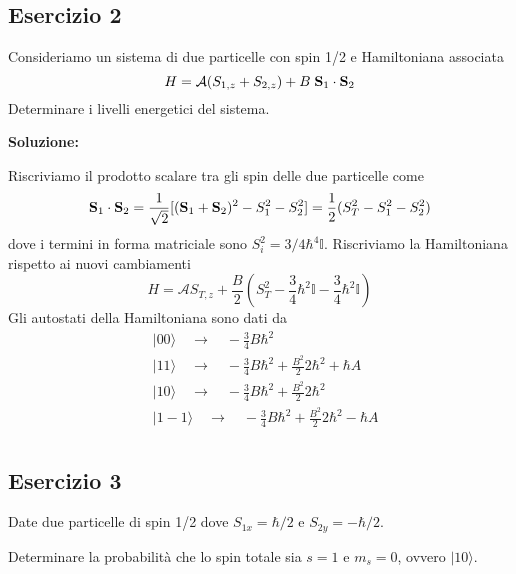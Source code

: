 \subsection{Esercizio 2}

Consideriamo un sistema di due particelle con spin 1/2 e Hamiltoniana associata
\begin{equation*}
	H = \mathcal{A}(S_{1,z}+S_{2,z}) + B \;\bold{S}_1 \cdot \bold{S}_2
\end{equation*}
Determinare i livelli energetici del sistema.
\newline

\noindent\textbf{Soluzione:}
\newline

	Riscriviamo il prodotto scalare tra gli spin delle due particelle come
\begin{equation*}
	\bold{S}_1 \cdot \bold{S}_2 = \frac{1}{\sqrt{2}}[(\bold{S}_1 + \bold{S}_2)^2 - S_1^2 -S_2^2] = \frac{1}{2}(S_T^2 - S_1^2-S_2^2)
\end{equation*}
dove i termini in forma matriciale sono $S_i^2 = 3/4 \hbar ^4  \mathbb{I}$. Riscriviamo la Hamiltoniana rispetto ai nuovi cambiamenti
\begin{equation*}
	H = \mathcal{A}S_{T,z} + \frac{B}{2}\left(S^2_T - \frac{3}{4}\hbar^2 \mathbb{I} - \frac{3}{4}\hbar^2 \mathbb{I}\right)
\end{equation*}
\newpage
Gli autostati della Hamiltoniana sono dati da 
\begin{align*}
	&|00 \rangle \quad \to \quad - \frac{3}{4}B\hbar^2 \\[0.4cm]
	&|11 \rangle \quad \to \quad - \frac{3}{4}B \hbar^2 + \frac{B^2}{2}2\hbar^2 + \hbar A \\[0.4cm]
	&|10 \rangle \quad \to \quad - \frac{3}{4}B \hbar^2 + \frac{B^2}{2}2\hbar^2  \\[0.4cm]
	&|1-1 \rangle \quad \to \quad - \frac{3}{4}B \hbar^2 + \frac{B^2}{2}2\hbar^2 - \hbar A \\
\end{align*}


\subsection{Esercizio 3}

Date due particelle di spin 1/2 dove $S_{1x}  = \hbar/2$ e $S_{2y} = -\hbar /2$.

Determinare la probabilit\`a che lo spin totale sia $s=1$ e $m_{s} = 0$, ovvero $|10\rangle$.

